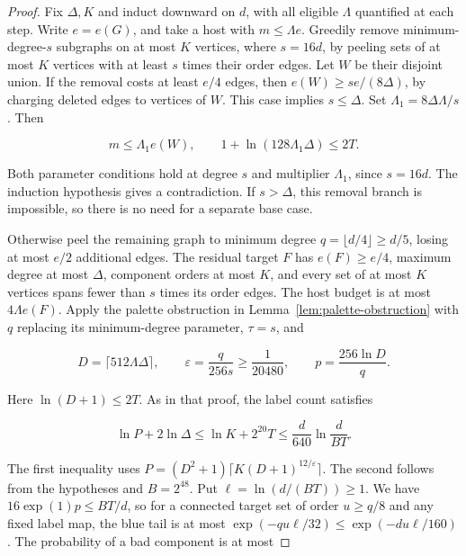 \documentclass[11pt]{amsart}
\theoremstyle{definition}
\theoremstyle{remark}
\numberwithin{equation}{section}
\begin{document}
\begin{proof}

Fix $\Delta,K $ and induct downward on $d $, with all eligible $\Lambda $ quantified at each step. Write $ e=e(G)$, and take a host with $ m\le\Lambda e $. Greedily remove minimum-degree-$ s $ subgraphs on at most $ K $ vertices, where $ s=16d $, by peeling sets of at most $ K $ vertices with at least $ s $ times their order edges. Let $ W $ be their disjoint union. If the removal costs at least $ e/4$ edges, then $ e(W)\ge se/(8\Delta)$, by charging deleted edges to vertices of $ W $. This case implies $ s\le\Delta $. Set $\Lambda_1=8\Delta\Lambda/s$. Then

\begin{equation}
m\le\Lambda_1 e(W),\qquad
1+\ln(128\Lambda_1\Delta)\le2T.
\end{equation}

Both parameter conditions hold at degree $s $ and multiplier $\Lambda_1$, since $ s=16d $. The induction hypothesis gives a contradiction. If $ s>\Delta$, this removal branch is impossible, so there is no need for a separate base case.

Otherwise peel the remaining graph to minimum degree $q=\lfloor d/4\rfloor\ge d/5$, losing at most $ e/2$ additional edges. The residual target $ F $ has $ e(F)\ge e/4$, maximum degree at most $\Delta $, component orders at most $ K $, and every set of at most $ K $ vertices spans fewer than $ s $ times its order edges. The host budget is at most $4\Lambda e(F)$. Apply the palette obstruction in Lemma~\ref{lem:palette-obstruction} with $ q $ replacing its minimum-degree parameter, $\tau=s$, and

\begin{equation}
D=\lceil512\Lambda\Delta\rceil,\qquad
\varepsilon=\frac{q}{256s}\ge\frac1{20480},\qquad
p=\frac{256\ln D}{q}.
\end{equation}

Here $\ln(D+1)\le2T$. As in that proof, the label count satisfies

\begin{equation}
\ln P+2\ln\Delta\le\ln K+2^{20}T\le \frac{d}{640}\ln\frac{d}{BT}.
\end{equation}

The first inequality uses $P=(D^2+1)\lceil K(D+1)^{12/\varepsilon}\rceil $. The second follows from the hypotheses and $ B=2^{48}$. Put $\ell=\ln(d/(BT))\ge1$. We have $16\exp(1)p\le BT/d $, so for a connected target set of order $ u\ge q/8$ and any fixed label map, the blue tail is at most $\exp(-qu\ell/32)\le \exp(-du\ell/160)$. The probability of a bad component is at most


\end{proof}
\end{document}
